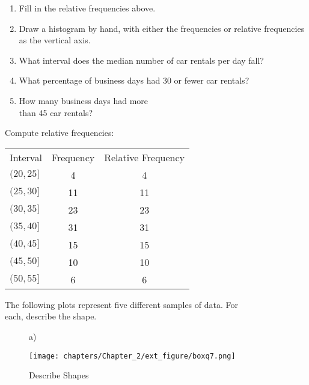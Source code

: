 \documentclass[11pt]{book}\usepackage[]{graphicx}\usepackage[]{color}
\begin{document}
\begin{exercises}
\begin{exercise}
\begin{enumerate}
\item Fill in the relative frequencies above.
\item	Draw a histogram by hand, with either the frequencies or relative frequencies as the vertical axis.
\item	What interval does the median number of car rentals per day fall?
\item What percentage of business days had 30 or fewer car rentals?
\item	How many business days had more \\ than 45 car rentals?
\end{enumerate}


	\end{exercise}
	\begin{solution}  %


Compute relative frequencies:

\begin{tabular}{@{} lcc @{}} \hline
Interval  &  Frequency &	Relative Frequency \\
$(20, 25]$ 	&     4 & 4  \\
$(25, 30]$ 	&    11 & 11 \\
$(30, 35]$ 	&    23 & 23 \\
$(35, 40]$ 	&    31 & 31 \\
$(40, 45]$ 	&    15 & 15 \\
$(45, 50]$ 	&    10 & 10 \\
$(50, 55]$ 	&     6 & 6 \\ \hline
\end{tabular}


	\end{solution}

\begin{exercise}  %

The following plots represent five different samples of data. For \\ each, describe the shape.

\begin{figure}[ht]
  \caption{Describe Shapes}

\begin{minipage}[ht]{3cm}

  a)

  \texttt{[image: chapters/Chapter\_2/ext\_figure/boxq7.png]}
  \end{minipage} \hfill
  \begin{minipage}[ht]{3cm}


\end{minipage}
\end{figure}
\end{exercise}
\end{exercises}
\end{document}
